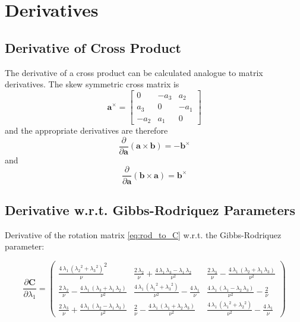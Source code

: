 \chapter{Derivatives}
\label{app:derivatives}

\section{Derivative of Cross Product}
\label{sec:app_d_cross_product}
The derivative of a cross product can be calculated analogue to matrix derivatives.
The skew symmetric cross matrix is
\begin{equation}
\mathbf{a}^\times = \left[
\begin{array}{ccc}
0 & -a_3 & a_2 \\
a_3 & 0 & -a_1 \\
-a_2 & a_1 & 0
\end{array} \right]
\end{equation}
and the appropriate derivatives are therefore
\begin{equation}
\frac{\partial}{\partial \mathbf{a}} \left( \mathbf{a} \times \mathbf{b} \right)
= - \mathbf{b}^\times
\end{equation}
and
\begin{equation}
\frac{\partial}{\partial \mathbf{a}} \left( \mathbf{b} \times \mathbf{a} \right)
=  \mathbf{b}^\times
\end{equation}

\newpage
\section{Derivative w.r.t. Gibbs-Rodriquez Parameters}
\label{sec:app_dwrt_rodriquez}
Derivative of the rotation matrix \cref{eq:rod_to_C} w.r.t. the Gibbs-Rodriquez parameter:

\begin{equation}
\frac{\partial \mathbf{C}}{\partial \lambda_1} = 
\left(\begin{array}{ccc} 
\frac{4\, {\lambda_1}\, \left({{\lambda_2}}^2 + {{\lambda_3}}^2\right)}{\nu}^2 & 
\frac{2\, {\lambda_2}}{\nu} + \frac{4\, {\lambda_1}\, {\lambda_3} - {\lambda_1}\, {\lambda_2}}{\nu^2} & 
\frac{2\, {\lambda_3}}{\nu} - \frac{4\, {\lambda_1}\, \left({\lambda_2} + {\lambda_1}\, {\lambda_3}\right)}{\nu^2}\\ 
\frac{2\, {\lambda_2}}{\nu} - \frac{4\, {\lambda_1}\, \left({\lambda_3} + {\lambda_1}\, {\lambda_2}\right)}{\nu^2} & 
\frac{4\, {\lambda_1}\, \left({{\lambda_1}}^2 + {{\lambda_3}}^2\right)}{\nu^2} - \frac{4\, {\lambda_1}}{\nu} &
\frac{4\, {\lambda_1}\, \left({\lambda_1} - {\lambda_2}\, {\lambda_3}\right)}{\nu^2} - \frac{2}{\nu}\\
\frac{2\, {\lambda_3}}{\nu} + \frac{4\, {\lambda_1}\, \left({\lambda_2} - {\lambda_1}\, {\lambda_3}\right)}{\nu^2} &
\frac{2}{\nu} - \frac{4\, {\lambda_1}\, \left({\lambda_1} + {\lambda_2}\, {\lambda_3}\right)}{\nu^2} & \frac{4\, {\lambda_1}\, \left({{\lambda_1}}^2 + {{\lambda_2}}^2\right)}{\nu^2} - \frac{4\, {\lambda_1}}{\nu}
\end{array}\right)
\end{equation}

